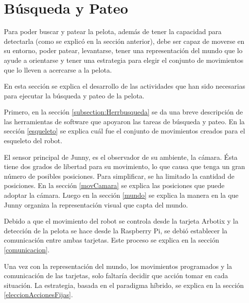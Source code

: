 \section{B\'usqueda y Pateo}\label{sec:busqueda}

Para poder buscar y patear la pelota, además de tener la capacidad para detectarla (como se explicó en la secci\'on anterior), debe ser capaz de moverse en su entorno, poder patear, levantarse, tener una representación del mundo que lo ayude a orientarse y tener una estrategia para elegir el conjunto de movimientos que lo lleven a acercarse a la pelota. 

En esta sección se explica el desarrollo de las actividades que han sido necesarias para ejecutar la búsqueda y pateo de la pelota.

Primero, en la sección \ref{subsection:Herrbusqueda} se da una breve descripción de las herramientas de software que apoyaron las tareas de búsqueda y pateo. En la sección \ref{esqueleto} se explica cuál fue el conjunto de movimientos creados para el esqueleto del robot.

El sensor principal de Junny, es el observador de su ambiente, la c\'amara. \'Esta tiene dos grados de libertad para su movimiento, lo que causa que tenga un gran número de posibles posiciones. Para simplificar, se ha limitado la cantidad de posiciones. En la secci\'on \ref{movCamara} se explica las posiciones que puede adoptar la cámara. Luego en la secci\'on \ref{mundo} se explica la manera en la que Junny organiza la representaci\'on visual que capta del mundo.

Debido a que el movimiento del robot se controla desde la tarjeta Arbotix y la detecci\'on de la pelota se hace desde la Raspberry Pi, se debi\'o establecer la comunicaci\'on entre ambas tarjetas. Este proceso se explica en la secci\'on \ref{comunicacion}.

Una vez con la representaci\'on del mundo, los movimientos programados y la comunicaci\'on de las tarjetas, solo faltaría decidir que acci\'on tomar en cada situación. La estrategia, basada en el paradigma h\'ibrido, se explica en la secci\'on \ref{eleccionAccionesFijas}.        

 
